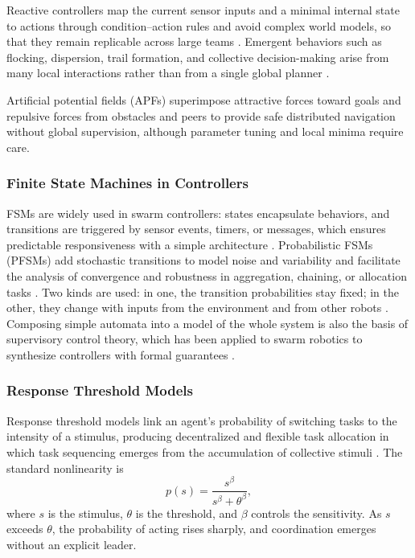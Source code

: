 Reactive controllers map the current sensor inputs and a minimal internal state
to actions through condition--action rules and avoid complex world models, so
that they remain replicable across large teams \cite{hamann2018swarm}. Emergent behaviors
such as flocking, dispersion, trail formation, and collective decision-making
arise from many local interactions rather than from a single global planner
\cite{bhowmick2024bio}.

Artificial potential fields (APFs) superimpose attractive forces toward goals and
repulsive forces from obstacles and peers to provide safe distributed navigation
without global supervision, although parameter tuning and local minima require
care.

\subsubsection{Finite State Machines in Controllers}

FSMs are widely used in swarm controllers: states encapsulate behaviors, and
transitions are triggered by sensor events, timers, or messages, which ensures
predictable responsiveness with a simple architecture \cite{hamann2018swarm}. Probabilistic
FSMs (PFSMs) add stochastic transitions to model noise and variability and
facilitate the analysis of convergence and robustness in aggregation, chaining,
or allocation tasks \cite{hamann2018swarm}. Two kinds are used: in one, the
transition probabilities stay fixed; in the other, they change with inputs from
the environment and from other robots \cite{brambilla2013swarm}. Composing simple
automata into a model of the whole system is also the basis of supervisory
control theory, which has been applied to swarm robotics to synthesize
controllers with formal guarantees \cite{lopes2016supervisory}.

\subsubsection{Response Threshold Models}

Response threshold models link an agent's probability of switching tasks to the
intensity of a stimulus, producing decentralized and flexible task allocation in
which task sequencing emerges from the accumulation of collective stimuli
\cite{brambilla2013swarm,bonabeau1999swarm}. The standard nonlinearity is
\begin{equation}
  p(s) = \frac{s^{\beta}}{s^{\beta} + \theta^{\beta}},
  \label{eq:response-threshold}
\end{equation}
where $s$ is the stimulus, $\theta$ is the threshold, and $\beta$ controls the
sensitivity. As $s$ exceeds $\theta$, the probability of acting rises sharply,
and coordination emerges without an explicit leader.

